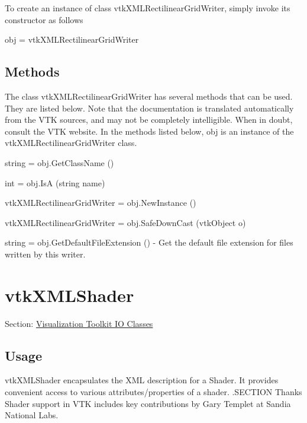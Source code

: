 To create an instance of class vtk\-X\-M\-L\-Rectilinear\-Grid\-Writer, simply invoke its constructor as follows \begin{DoxyVerb}  obj = vtkXMLRectilinearGridWriter
\end{DoxyVerb}
 \hypertarget{vtkwidgets_vtkxyplotwidget_Methods}{}\subsection{Methods}\label{vtkwidgets_vtkxyplotwidget_Methods}
The class vtk\-X\-M\-L\-Rectilinear\-Grid\-Writer has several methods that can be used. They are listed below. Note that the documentation is translated automatically from the V\-T\-K sources, and may not be completely intelligible. When in doubt, consult the V\-T\-K website. In the methods listed below, {\ttfamily obj} is an instance of the vtk\-X\-M\-L\-Rectilinear\-Grid\-Writer class. 
\begin{DoxyItemize}
\item {\ttfamily string = obj.\-Get\-Class\-Name ()}  
\item {\ttfamily int = obj.\-Is\-A (string name)}  
\item {\ttfamily vtk\-X\-M\-L\-Rectilinear\-Grid\-Writer = obj.\-New\-Instance ()}  
\item {\ttfamily vtk\-X\-M\-L\-Rectilinear\-Grid\-Writer = obj.\-Safe\-Down\-Cast (vtk\-Object o)}  
\item {\ttfamily string = obj.\-Get\-Default\-File\-Extension ()} -\/ Get the default file extension for files written by this writer.  
\end{DoxyItemize}\hypertarget{vtkio_vtkxmlshader}{}\section{vtk\-X\-M\-L\-Shader}\label{vtkio_vtkxmlshader}
Section\-: \hyperlink{sec_vtkio}{Visualization Toolkit I\-O Classes} \hypertarget{vtkwidgets_vtkxyplotwidget_Usage}{}\subsection{Usage}\label{vtkwidgets_vtkxyplotwidget_Usage}
vtk\-X\-M\-L\-Shader encapsulates the X\-M\-L description for a Shader. It provides convenient access to various attributes/properties of a shader. .S\-E\-C\-T\-I\-O\-N Thanks Shader support in V\-T\-K includes key contributions by Gary Templet at Sandia National Labs.

